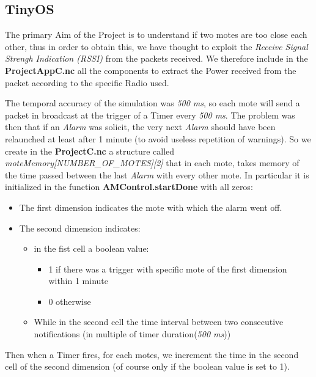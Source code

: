 
\subsection{TinyOS}
The primary Aim of the Project is to understand if two motes are too close each other, thus 
in order to obtain this, we have thought to exploit the \textit{Receive Signal Strengh Indication (RSSI)}
from the packets received.
We therefore include in the \textbf{ProjectAppC.nc} all the components to extract the Power received 
from the packet according to the specific Radio used. 

The temporal accuracy of the simulation was \textit{500 ms}, so each mote will send a packet in broadcast
at the trigger of a Timer every \textit{500 ms}.
The problem was then that if an \textit{Alarm} was solicit, the very next \textit{Alarm} should have been
relaunched at least after 1 minute (to avoid useless repetition of warnings).
So we create in the \textbf{ProjectC.nc} a structure called \textit{moteMemory[NUMBER_OF_MOTES][2]} that in 
each mote, takes memory of the time passed between the last \textit{Alarm} with every other mote.
In particular it is initialized in the function \textbf{AMControl.startDone} with all zeros:
\begin{itemize}
    \item The first dimension indicates the mote with which the alarm went off.
    \item The second dimension indicates:
        \begin{itemize}
            \item in the fist cell a boolean value:
                \begin{itemize}
                    \item 1 if there was a trigger with specific mote of the first dimension within 1 minute
                    \item 0 otherwise
                \end{itemize}
            \item While in the second cell the time interval between two consecutive notifications 
            (in multiple of timer duration(\textit{500 ms}))
        \end{itemize}
\end{itemize}

Then when a Timer fires, for each motes, we increment the time in the second cell of the second dimension
(of course only if the boolean value is set to 1).

